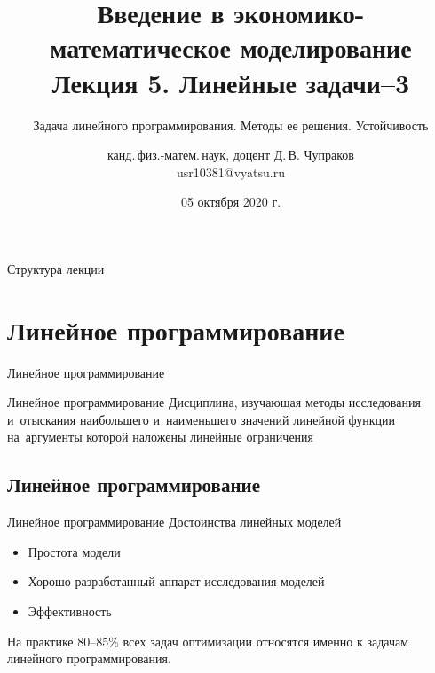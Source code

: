 \documentclass[unicode,11pt,notheorems]{beamer}
\author[Д.\,В. Чупраков]{канд.\,физ.-матем.\,наук, доцент Д.\,В. Чупраков\\[6pt] usr10381@vyatsu.ru}
\institute[ВятГУ]{ФГБОУ ВО Вятский государственный университет}
\title[Лекция~5. Линейные задачи. Часть~3 из 4]{
	Введение в экономико-математическое моделирование\\[12pt]
	Лекция 5. Линейные задачи--3}
\subtitle{Задача линейного программирования. Методы ее решения. Устойчивость}
\date{05 октября 2020 г.}
\begin{document}
\maketitle

\begin{frame}{Структура лекции}
	\tableofcontents
\end{frame}


\section{Линейное программирование}

\begin{frame}[t]{}{}
	\vspace{2cm}
	{\LARGE Линейное программирование\par}
	\vspace{\fill}
	
	{\begin{alertblock}{Линейное программирование}
			Дисциплина, изучающая методы исследования и~отыскания наибольшего и~наименьшего значений линейной функции на~аргументы которой наложены линейные ограничения
		\end{alertblock}}
	\end{frame}   
	
	\subsection{Линейное программирование}
	\begin{frame}{Линейное программирование}{}
		Достоинства линейных моделей
		\begin{itemize}
			\item Простота модели
			\item Хорошо разработанный аппарат исследования моделей
			\item Эффективность
		\end{itemize}
		\begin{block}{}
			На практике 80--85\% всех задач оптимизации относятся именно к задачам линейного программирования.
		\end{block}
	\end{frame}   
	
\end{document}
